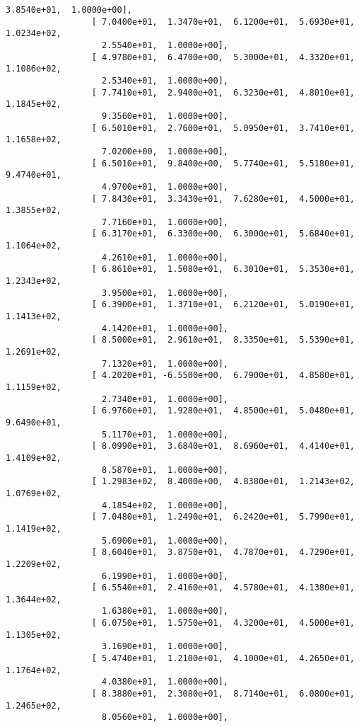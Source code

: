 \documentclass[11pt]{article}
\begin{document}
\begin{Verbatim}[commandchars=\\\{\}]
                   3.8540e+01,  1.0000e+00],
                 [ 7.0400e+01,  1.3470e+01,  6.1200e+01,  5.6930e+01,  1.0234e+02,
                   2.5540e+01,  1.0000e+00],
                 [ 4.9780e+01,  6.4700e+00,  5.3000e+01,  4.3320e+01,  1.1086e+02,
                   2.5340e+01,  1.0000e+00],
                 [ 7.7410e+01,  2.9400e+01,  6.3230e+01,  4.8010e+01,  1.1845e+02,
                   9.3560e+01,  1.0000e+00],
                 [ 6.5010e+01,  2.7600e+01,  5.0950e+01,  3.7410e+01,  1.1658e+02,
                   7.0200e+00,  1.0000e+00],
                 [ 6.5010e+01,  9.8400e+00,  5.7740e+01,  5.5180e+01,  9.4740e+01,
                   4.9700e+01,  1.0000e+00],
                 [ 7.8430e+01,  3.3430e+01,  7.6280e+01,  4.5000e+01,  1.3855e+02,
                   7.7160e+01,  1.0000e+00],
                 [ 6.3170e+01,  6.3300e+00,  6.3000e+01,  5.6840e+01,  1.1064e+02,
                   4.2610e+01,  1.0000e+00],
                 [ 6.8610e+01,  1.5080e+01,  6.3010e+01,  5.3530e+01,  1.2343e+02,
                   3.9500e+01,  1.0000e+00],
                 [ 6.3900e+01,  1.3710e+01,  6.2120e+01,  5.0190e+01,  1.1413e+02,
                   4.1420e+01,  1.0000e+00],
                 [ 8.5000e+01,  2.9610e+01,  8.3350e+01,  5.5390e+01,  1.2691e+02,
                   7.1320e+01,  1.0000e+00],
                 [ 4.2020e+01, -6.5500e+00,  6.7900e+01,  4.8580e+01,  1.1159e+02,
                   2.7340e+01,  1.0000e+00],
                 [ 6.9760e+01,  1.9280e+01,  4.8500e+01,  5.0480e+01,  9.6490e+01,
                   5.1170e+01,  1.0000e+00],
                 [ 8.0990e+01,  3.6840e+01,  8.6960e+01,  4.4140e+01,  1.4109e+02,
                   8.5870e+01,  1.0000e+00],
                 [ 1.2983e+02,  8.4000e+00,  4.8380e+01,  1.2143e+02,  1.0769e+02,
                   4.1854e+02,  1.0000e+00],
                 [ 7.0480e+01,  1.2490e+01,  6.2420e+01,  5.7990e+01,  1.1419e+02,
                   5.6900e+01,  1.0000e+00],
                 [ 8.6040e+01,  3.8750e+01,  4.7870e+01,  4.7290e+01,  1.2209e+02,
                   6.1990e+01,  1.0000e+00],
                 [ 6.5540e+01,  2.4160e+01,  4.5780e+01,  4.1380e+01,  1.3644e+02,
                   1.6380e+01,  1.0000e+00],
                 [ 6.0750e+01,  1.5750e+01,  4.3200e+01,  4.5000e+01,  1.1305e+02,
                   3.1690e+01,  1.0000e+00],
                 [ 5.4740e+01,  1.2100e+01,  4.1000e+01,  4.2650e+01,  1.1764e+02,
                   4.0380e+01,  1.0000e+00],
                 [ 8.3880e+01,  2.3080e+01,  8.7140e+01,  6.0800e+01,  1.2465e+02,
                   8.0560e+01,  1.0000e+00],

\end{Verbatim}
\end{document}
